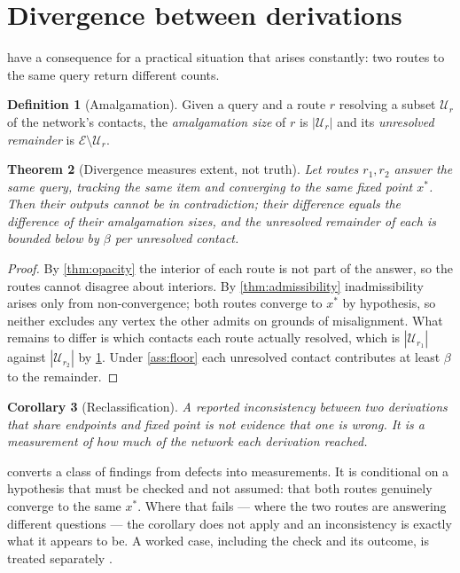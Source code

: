 \documentclass[11pt,twocolumn,a4paper]{article}
\theoremstyle{plain}
\newtheorem{theorem}{Theorem}[section]
\newtheorem{corollary}[theorem]{Corollary}
\theoremstyle{definition}
\newtheorem{definition}[theorem]{Definition}
\theoremstyle{remark}
\begin{document}
\section{Divergence between derivations}
\label{sec:divergence}

 have a consequence for a practical
situation that arises constantly: two routes to the same query return different
counts.

\begin{definition}[Amalgamation]
\label{def:amalgamation}
Given a query and a route $r$ resolving a subset $\mathcal{U}_r$ of the
network's contacts, the \emph{amalgamation size} of $r$ is $|\mathcal{U}_r|$
and its \emph{unresolved remainder} is
$\mathcal{E}\setminus\mathcal{U}_r$.
\end{definition}

\begin{theorem}[Divergence measures extent, not truth]
\label{thm:amalgamation}
Let routes $r_1,r_2$ answer the same query, tracking the same item and
converging to the same fixed point $x^*$. Then their outputs cannot be in
contradiction; their difference equals the difference of their amalgamation
sizes, and the unresolved remainder of each is bounded below by $\beta$ per
unresolved contact.
\end{theorem}

\begin{proof}
By \cref{thm:opacity} the interior of each route is not part of the answer, so
the routes cannot disagree about interiors. By \cref{thm:admissibility}
inadmissibility arises only from non-convergence; both routes converge to $x^*$
by hypothesis, so neither excludes any vertex the other admits on grounds of
misalignment. What remains to differ is which contacts each route actually
resolved, which is $|\mathcal{U}_{r_1}|$ against $|\mathcal{U}_{r_2}|$ by
\cref{def:amalgamation}. Under \cref{ass:floor} each unresolved contact
contributes at least $\beta$ to the remainder.
\end{proof}

\begin{corollary}[Reclassification]
\label{cor:reclassify}
A reported inconsistency between two derivations that share endpoints and fixed
point is not evidence that one is wrong. It is a measurement of how much of the
network each derivation reached.
\end{corollary}

 converts a class of findings from defects into
measurements. It is conditional on a hypothesis that must be checked and not
assumed: that both routes genuinely converge to the same $x^*$. Where that fails
--- where the two routes are answering different questions --- the corollary
does not apply and an inconsistency is exactly what it appears to be. A worked
case, including the check and its outcome, is treated separately
\citep{Sachikonye2026Divergence}.
\end{document}
